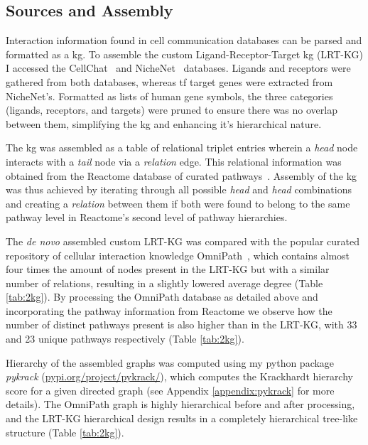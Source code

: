 \subsection{Sources and Assembly}

Interaction information found in cell communication databases can be parsed and formatted as a \acrfull{kg}. To assemble the custom Ligand-Receptor-Target \acrshort{kg} (LRT-KG) I accessed the CellChat~\cite{sqjin_sqjincellchat_2021} and NicheNet~\cite{browaeys_nichenet_2020} databases. Ligands and receptors were gathered from both databases, whereas \acrfull{tf} target genes were extracted from NicheNet's. Formatted as lists of human gene symbols, the three categories (ligands, receptors, and targets) were pruned to ensure there was no overlap between them, simplifying the \acrshort{kg} and enhancing it's hierarchical nature. 

The \acrshort{kg} was assembled as a table of relational triplet entries wherein a \emph{head} node interacts with a \emph{tail} node via a \emph{relation} edge. This relational information was obtained from the Reactome database of curated pathways~\cite{gillespie_reactome_2022}. Assembly of the \acrshort{kg} was thus achieved by iterating through all possible \emph{head} and \emph{head} combinations and creating a \emph{relation} between them if both were found to belong to the same pathway level in Reactome's second level of pathway hierarchies.

The \emph{de novo} assembled custom LRT-KG was compared with the popular curated repository of cellular interaction knowledge OmniPath~\cite{turei_integrated_2021}, which contains almost four times the amount of nodes present in the LRT-KG but with a similar number of relations, resulting in a slightly lowered average degree (Table \ref{tab:2kg}). By processing the OmniPath database as detailed above and incorporating the pathway information from Reactome we observe how the number of distinct pathways present is also higher than in the LRT-KG, with 33 and 23 unique pathways respectively (Table \ref{tab:2kg}).

Hierarchy of the assembled graphs was computed using my python package \emph{pykrack} (\url{pypi.org/project/pykrack/}), which computes the Krackhardt hierarchy score for a given directed graph (see Appendix \ref{appendix:pykrack} for more details). The OmniPath graph is highly hierarchical before and after processing, and the LRT-KG hierarchical design results in a completely hierarchical tree-like structure (Table \ref{tab:2kg}).

